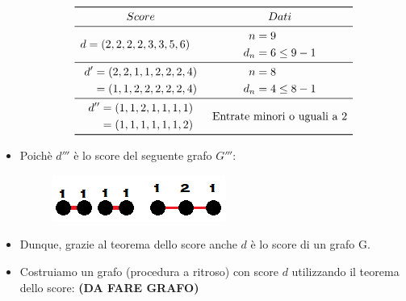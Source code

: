 \documentclass[10pt]{article}
\begin{document}
\begin{itemize}
	\[
	\begin{array}{cc}
		\toprule
		Score & Dati \\
		\midrule
		\begin{split} d &= (2,2,2,2,3,3,5,6) \end{split} & \begin{split} n &= 9 \\ d_n &= 6 \leq 9 -1 \end{split} \\
		\midrule
		\begin{split} d' &= (2,2,1,1,2,2,2,4) \\ &= (1,1,2,2,2,2,2,4) \end{split} & \begin{split} n &= 8 \\ d_n &= 4 \leq 8 -1 \end{split} \\
		\midrule
		\begin{split} d'' &= (1,1,2,1,1,1,1) \\ &= (1,1,1,1,1,1,2) \end{split} & \textrm{Entrate minori o uguali a 2} \\
		\bottomrule
	\end{array}
	\]
	\item
	Poichè $d'''$ è lo score del seguente grafo $G'''$:
	\begin{center}
		\begin{figure}[h]
		\centering
		\includegraphics[width = 0.2\linewidth]{scoreGrafo_Esercizio3}
	\end{figure}
	\end{center}
	\item 
	Dunque, grazie al teorema dello score anche $d$ è lo score di un grafo G.
	\item
	Costruiamo un grafo (procedura a ritroso) con score $d$ utilizzando il teorema dello score: \textbf{(DA FARE GRAFO)}
	\end{itemize}
	
\end{document}
